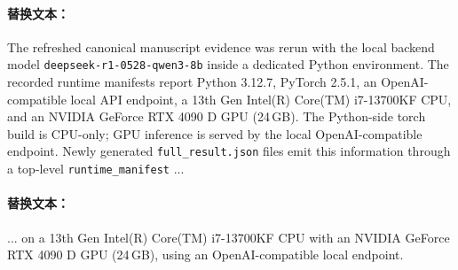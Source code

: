 
\paragraph{替换文本：}
The refreshed canonical manuscript evidence was rerun with the local backend
model \texttt{deepseek-r1-0528-qwen3-8b} inside a dedicated Python environment.
The recorded runtime manifests report Python 3.12.7, PyTorch 2.5.1, an
OpenAI-compatible local API endpoint, a 13th Gen Intel(R) Core(TM) i7-13700KF
CPU, and an NVIDIA GeForce RTX 4090 D GPU (24\,GB). The Python-side torch build
is CPU-only; GPU inference is served by the local OpenAI-compatible endpoint.
Newly generated \texttt{full\_result.json} files emit this information through a
top-level \texttt{runtime\_manifest} ...

\paragraph{替换文本：}
... on a 13th Gen Intel(R) Core(TM) i7-13700KF CPU with an NVIDIA GeForce RTX
4090 D GPU (24\,GB), using an OpenAI-compatible local endpoint.

